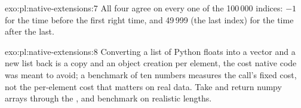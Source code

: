 \begin{solution}{exo:pl:native-extensions:7}
All four agree on every one of the 100\,000 indices: $-1$ for the time before the first right time, and 49\,999 (the last index) for the
time after the last.
\end{solution}

\begin{solution}{exo:pl:native-extensions:8}
Converting a list of Python floats into a vector and a new list back is a copy and an object creation per element, the cost native code was
meant to avoid; a benchmark of ten numbers measures the call's fixed cost, not the per-element cost that matters on real data. Take and
return numpy arrays through the , and benchmark on realistic lengths.
\end{solution}

